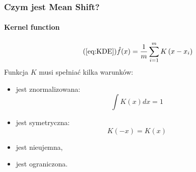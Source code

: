 \documentclass{beamer}
\begin{document}
	\begin{frame}
		\frametitle{Czym jest Mean Shift?}
		\framesubtitle{Kernel function}
		\begin{equation*}\tag{\ref{eq:KDE}}
		\hat{f}(x) = \frac{1}{m}\sum_{i=1}^{m}K\left(x - x_{i}\right)
		\end{equation*}
		Funkcja \(K\) musi spełniać kilka warunków:
		\begin{itemize}
			\item jest znormalizowana:
			\[\int K(x) dx = 1\]
			\item jest symetryczna:
			\[K(-x) = K(x)\]
			\item jest nieujemna,
			\item jest ograniczona.
		\end{itemize}
	\end{frame}
	
\end{document}
